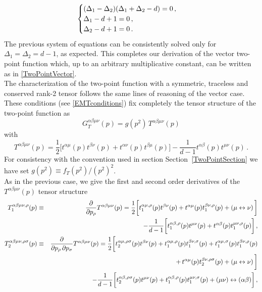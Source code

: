 \documentclass[a4paper,11pt,openright,twoside]{book}
\newcommand{\secref}[1]{Section~\ref{#1}}		%
\numberwithin{equation}{section}
\begin{document}
\begin{equation}
	\begin{cases}
		(\Delta_1 - \Delta_2) (\Delta_1 + \Delta_2 - d) = 0 \,, \notag \\
		\Delta_1 - d +1 = 0 \,, \notag \\
		\Delta_2 - d +1 = 0 \,. \notag
	\end{cases}
	\\
\end{equation}
The previous system of equations can be consistently solved only for $\Delta_1 = \Delta_2 = d -1$, as expected. This completes our derivation of the vector two-point function which, up to an arbitrary multiplicative constant, can be written as in \eqref{TwoPointVector}. \\
The characterization of the two-point function with a symmetric, traceless and conserved rank-2 tensor follows the same lines of reasoning of the vector case. These conditions (see \eqref{EMTconditions}) fix completely the tensor structure of the two-point function as
\begin{equation}
	G_T^{\alpha\beta\mu\nu}(p) = g(p^2) \, T^{\alpha\beta\mu\nu}(p) 
\end{equation}
with
\begin{equation}
	T^{\alpha\beta\mu\nu}(p) =  \frac{1}{2} \bigg[ t^{\alpha\mu}(p) t^{\beta\nu}(p) + t^{\alpha\nu}(p) t^{\beta\mu}(p) 
	\bigg] 
	- \frac{1}{d-1} t^{\alpha\beta}(p) t^{\mu\nu}(p) \,.
\end{equation}
For consistency with the convention used in section \secref{TwoPointSection} we have set $g(p^2) \equiv f_T(p^2)/(p^2)^2$. \\
As in the previous case, we give the first and second order derivatives of the $T^{\alpha\beta\mu\nu}(p)$ tensor structure
\begin{eqnarray}
	\label{TTDerivatives}
	T_1^{\alpha\beta\mu\nu, \rho}(p) &\equiv& \frac{\partial}{\partial p_\rho} T^{\alpha\beta\mu\nu}(p) = \frac{1}{2} \bigg[ t_1^{\alpha\mu, \rho}(p) t^{\beta\nu}(p) 
	+ t^{\alpha\mu}(p) t_1^{\beta\nu, \rho}(p) + \left( \mu \leftrightarrow \nu \right) \bigg] \notag \\
	&& - \frac{1}{d-1} \bigg[ t_1^{\alpha\beta, \rho}(p) t^{\mu\nu}(p) + t^{\alpha\beta}(p) t_1^{\mu\nu, \rho}(p) \bigg] \,, \notag \\
	T_2^{\alpha\beta\mu\nu, \rho\sigma}(p) &\equiv& \frac{\partial}{\partial p_\rho \, \partial p_\sigma} T^{\alpha\beta\mu\nu}(p) = \frac{1}{2} \bigg[ 
	t_2^{\alpha\mu, \rho \sigma}(p) t^{\beta\nu}(p) + t_1^{\alpha\mu, \rho}(p) t_1^{\beta\nu, \sigma}(p) + t_1^{\alpha\mu, \sigma}(p) t_1^{\beta\nu, \rho}(p) \notag \\
	&& +  \, t^{\alpha\mu}(p) t_2^{\beta\nu, \rho \sigma}(p)+ \left( \mu \leftrightarrow \nu \right) \bigg]  \notag \\
	&& - \frac{1}{d-1} \bigg[  t_2^{\alpha\beta, \rho\sigma}(p) t^{\mu\nu}(p) +   t_1^{\alpha\beta, \rho}(p) t_1^{\mu\nu, \sigma}(p) + (\mu\nu) \leftrightarrow (\alpha\beta)  \bigg] \,,
\end{eqnarray}
\end{document}

